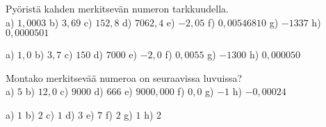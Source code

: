 \begin{tehtava}
Pyöristä kahden merkitsevän numeron tarkkuudella. \\
a) $1,0003$ \qquad
b) $3,69$ \qquad
c) $152,8$ \qquad
d) $7062,4$ \qquad
e) $-2,05$ \qquad
f) $0,00546810$ \qquad
g) $-1337$ \qquad
h) $0,0000501$
\begin{vastaus}
a) $1,0$ \qquad
b) $3,7$ \qquad
c) $150$ \qquad
d) $7000$ \qquad
e) $-2,0$ \qquad
f) $0,0055$ \qquad
g) $-1300$ \qquad
h) $0,000050$
\end{vastaus}
\end{tehtava}

\begin{tehtava}
Montako merkitsevää numeroa on seuraavissa luvuissa? \\
a) $5$ \qquad
b) $12,0$ \qquad
c) $9000$ \qquad
d) $666$ \qquad
e) $9000,000$ \qquad
f) $0,0$ \qquad
g) $-1$ \qquad
h) $-0,00024$
\begin{vastaus}
a) $1$ \qquad
b) $2$ \qquad
c) $1$ \qquad
d) $3$ \qquad
e) $7$ \qquad
f) $2$ \qquad
g) $1$ \qquad
h) $2$
\end{vastaus}
\end{tehtava}